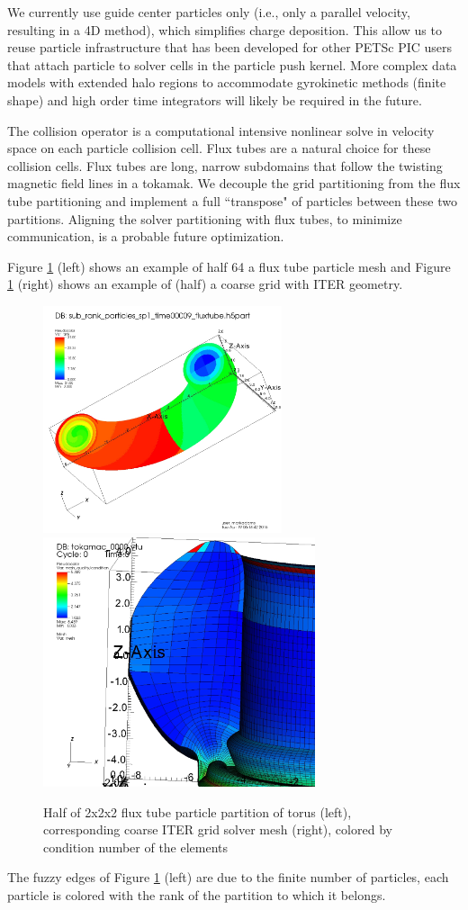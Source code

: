\documentclass[review]{siamart}
\begin{document}
We currently use guide center particles only (i.e., only a parallel velocity, resulting in a 4D method), which simplifies charge deposition.
This allow us to reuse particle infrastructure that has been developed for other PETSc PIC users \cite{may2014ptatin} that attach particle to solver cells in the particle push kernel.
More complex data models with extended halo regions to accommodate gyrokinetic methods (finite shape) and high order time integrators will likely be required in the future.

The collision operator is a computational intensive nonlinear solve in velocity space on each particle collision cell.
Flux tubes are a natural choice for these collision cells.
Flux tubes are long, narrow subdomains that follow the twisting magnetic field lines in a tokamak.
We decouple the grid partitioning from the flux tube partitioning and implement a full ``transpose" of particles between these two partitions.
Aligning the solver partitioning with flux tubes, to minimize communication, is a probable future optimization.

Figure \ref{fig:cross} (left) shows an example of half 64 a flux tube particle mesh and Figure \ref{fig:cross} (right) shows an example of (half) a coarse grid with ITER geometry.
\begin{figure}[h!]
   \centering
   \includegraphics[width=70mm]{half_fluxtubes_64.jpeg} 
    \includegraphics[width=80mm]{half_half_grid_mesh.jpeg} 
   \caption{Half of  2x2x2 flux tube particle partition of torus (left), corresponding coarse ITER grid solver mesh (right), colored by condition number of the elements}
   \label{fig:cross}
\end{figure}
The fuzzy edges of Figure \ref{fig:cross} (left) are due to the finite number of particles, each particle is colored with the rank of the partition to which it belongs.
\end{document}
